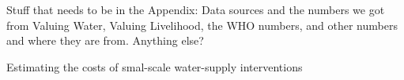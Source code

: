 Stuff that needs to be in the Appendix: 
Data sources and the numbers we got from Valuing Water, Valuing Livelihood, the WHO numbers, and other numbers and where they are from.
Anything else?
\begin{center}
Estimating the costs of smal-scale water-supply interventions
\end{center}